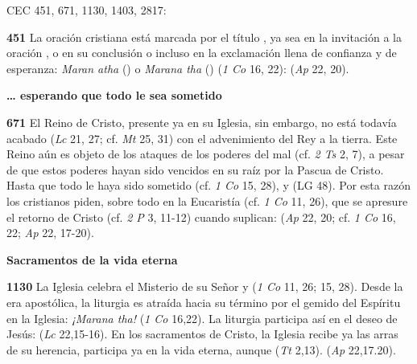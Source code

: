 
CEC 451, 671, 1130, 1403, 2817:

\textbf{451} La oración cristiana está marcada por el título , ya sea en la invitación a la oración , o en su conclusión  o incluso en la exclamación llena de confianza y de esperanza: \emph{Maran atha} () o \emph{Marana tha} () (\emph{1 Co} 16, 22):  (\emph{Ap} 22, 20).


\textbf{\ldots{} esperando que todo le sea sometido}

\textbf{671} El Reino de Cristo, presente ya en su Iglesia, sin embargo, no está todavía acabado  (\emph{Lc} 21, 27; cf. \emph{Mt} 25, 31) con el advenimiento del Rey a la tierra. Este Reino aún es objeto de los ataques de los poderes del mal (cf. \emph{2 Ts} 2, 7), a pesar de que estos poderes hayan sido vencidos en su raíz por la Pascua de Cristo. Hasta que todo le haya sido sometido (cf. \emph{1 Co} 15, 28), y  (LG 48). Por esta razón los cristianos piden, sobre todo en la Eucaristía (cf. \emph{1 Co} 11, 26), que se apresure el retorno de Cristo (cf. \emph{2 P} 3, 11-12) cuando suplican:  (\emph{Ap} 22, 20; cf. \emph{1 Co} 16, 22; \emph{Ap} 22, 17-20).

\textbf{Sacramentos de la vida eterna}

\textbf{1130} La Iglesia celebra el Misterio de su Señor  y  (\emph{1 Co} 11, 26; 15, 28). Desde la era apostólica, la liturgia es atraída hacia su término por el gemido del Espíritu en la Iglesia: \emph{¡Marana tha!} (\emph{1 Co} 16,22). La liturgia participa así en el deseo de Jesús:  (\emph{Lc} 22,15-16). En los sacramentos de Cristo, la Iglesia recibe ya las arras de su herencia, participa ya en la vida eterna, aunque  (\emph{Tt} 2,13).  (\emph{Ap} 22,17.20).


